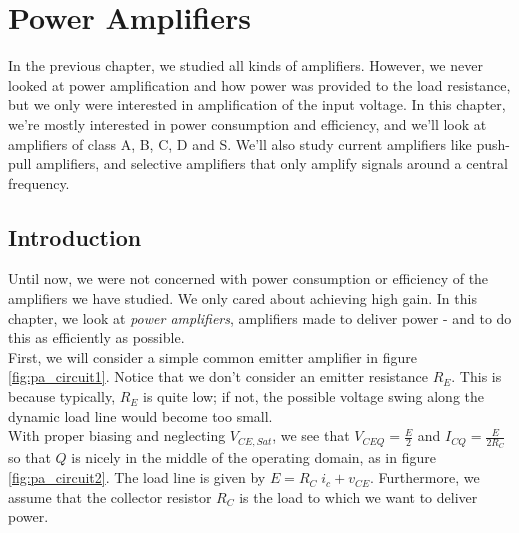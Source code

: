 \chapter{Power Amplifiers}

In the previous chapter, we studied all kinds of amplifiers. However, we never looked at power amplification and how power was provided to the load resistance,  but we only were interested in amplification of the input voltage. In this chapter, we're mostly interested in power consumption and efficiency, and we'll look at amplifiers of class A, B, C, D and S. We'll also study current amplifiers like push-pull amplifiers, and selective amplifiers that only amplify signals around a central frequency.

\section{Introduction}
Until now, we were not concerned with power consumption or efficiency of the amplifiers we have studied. We only cared about achieving high gain. In this chapter, we look at \emph{power amplifiers}, amplifiers made to deliver power - and to do this as efficiently as possible.\\
First, we will consider a simple common emitter amplifier in figure \ref{fig:pa_circuit1}. Notice that we don't consider an emitter resistance $R_E$. This is because typically, $R_E$ is quite low; if not, the possible voltage swing along the dynamic load line would become too small.\\
With proper biasing and neglecting $V_{CE, Sat}$, we see that $V_{CEQ} = \frac{E}{2}$ and $I_{CQ} = \frac{E}{2R_C}$ so that $Q$ is nicely in the middle of the operating domain, as in figure \ref{fig:pa_circuit2}. The load line is given by $E = R_C \; i_c + v_{CE}$. Furthermore, we assume that the collector resistor $R_C$ is the load to which we want to deliver power.

